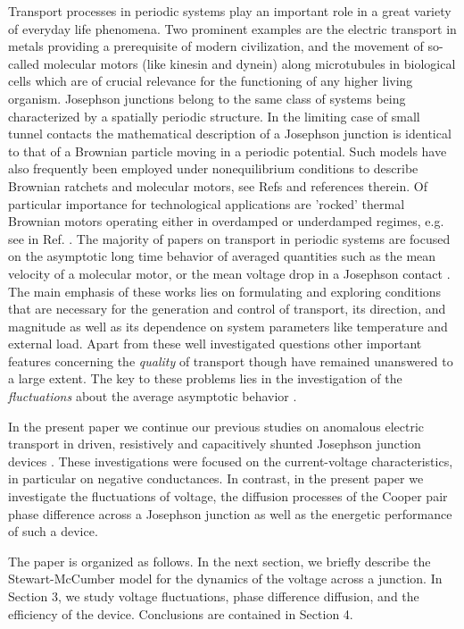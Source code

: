 \documentclass{physeauth}
\begin{document}
Transport processes in periodic systems play an important role 
in   a great variety of everyday life phenomena.     
Two prominent examples are the  electric transport in metals providing
a prerequisite of  modern civilization, and the movement 
of so-called molecular motors 
(like kinesin and dynein) along microtubules in biological cells which
are of crucial relevance for the functioning of any higher living organism.
Josephson junctions belong to the same class of systems being
characterized by a spatially periodic structure.  In the limiting case
of small tunnel contacts the mathematical description of a Josephson
junction is identical to that of a Brownian particle moving in a
periodic potential. Such models have also frequently been
employed under nonequilibrium conditions to
describe Brownian ratchets and molecular motors,
see Refs  \cite{hanRev,motor} and references therein.  
Of particular importance for technological applications are 'rocked' thermal Brownian motors
operating either in  overdamped or  underdamped regimes, e.g. see in Ref.  \cite{rocked}. 
The majority of papers on transport in periodic systems are focused on the asymptotic
long time behavior of averaged quantities such as the mean velocity
of a molecular motor, or the mean voltage drop in a Josephson contact
\cite{ratchet}. The main emphasis of these works lies  on formulating
and exploring    conditions that are necessary for the generation and control of
transport, its direction, 
and magnitude as well as its dependence on system parameters like temperature
and external load. Apart from these well investigated questions  
other important features concerning the {\it   quality} of transport though have remained 
unanswered to a large extent.  The key to
these problems lies in the investigation of the {\it fluctuations} about the
average asymptotic behavior \cite{machuraJPC}. 

In the present paper we
continue our previous studies on anomalous electric transport in driven,
resistively and capacitively shunted Josephson junction devices  
\cite{machuraPRL,aip,kosturPRB}. 
These  investigations were focused on the current-voltage
characteristics, in particular on  negative conductances.  In contrast, in the present paper we
investigate the fluctuations of voltage, the  diffusion processes of
the Cooper pair phase difference across a Josephson junction as well
as the energetic performance of such a device. 

The paper is organized as follows. In the next 
section,  we briefly describe  the Stewart-McCumber model for the dynamics
of the voltage  across a junction. In Section 3, we study voltage fluctuations, 
phase difference diffusion,  and the efficiency of the device.
Conclusions are contained in  Section 4.
\end{document}
